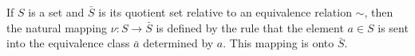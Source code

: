If $S$ is a set and $\bar{S}$ is its quotient set relative to an equivalence relation $\sim$, then the natural mapping $\nu : S \to \bar{S}$ is defined by the rule that the element $a \in S$ is sent into the equivalence class $\bar{a}$ determined by $a$. This mapping is onto $\bar{S}$.

